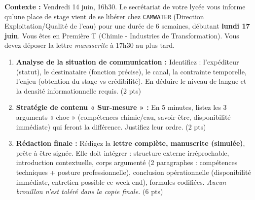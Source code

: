 \documentclass[11pt]{article}
\begin{document}
\begin{exercice}
\textbf{Contexte :} Vendredi 14 juin, 16h30. Le secrétariat de votre lycée vous informe qu'une place de stage vient de se libérer chez \texttt{CAMWATER} (Direction Exploitation/Qualité de l'eau) pour une durée de 6 semaines, débutant \textbf{lundi 17 juin}. Vous êtes en Première T (Chimie - Industries de Transformation). Vous devez déposer la lettre \textit{manuscrite} à 17h30 au plus tard.

\begin{enumerate}
    \item \textbf{Analyse de la situation de communication :} Identifiez : l'expéditeur (statut), le destinataire (fonction précise), le canal, la contrainte temporelle, l'enjeu (obtention du stage vs crédibilité). En déduire le niveau de langue et la densité informationnelle requis. \hfill (2 pts)
    \item \textbf{Stratégie de contenu « Sur-mesure » :} En 5 minutes, listez les 3 arguments « choc » (compétences chimie/eau, savoir-être, disponibilité immédiate) qui feront la différence. Justifiez leur ordre. \hfill (2 pts)
    \item \textbf{Rédaction finale :} Rédigez la \textbf{lettre complète, manuscrite (simulée)}, prête à être signée. Elle doit intégrer : structure externe irréprochable, introduction contextuelle, corps argumenté (2 paragraphes : compétences techniques + posture professionnelle), conclusion opérationnelle (disponibilité immédiate, entretien possible ce week-end), formules codifiées. \textit{Aucun brouillon n'est toléré dans la copie finale.} \hfill (6 pts)
\end{enumerate}
\end{exercice}
\end{document}
